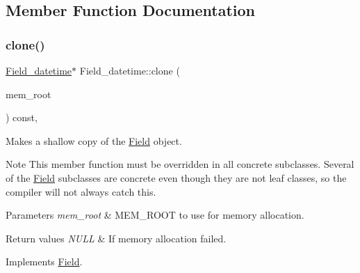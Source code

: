 \subsection{Member Function Documentation}
\mbox{\label{classField__datetime_acf05a58162e231080d9b1d4e6320abe1}} 
\subsubsection{\texorpdfstring{clone()}{clone()}\hspace{0.1cm}{\footnotesize\ttfamily [1/2]}}
{\footnotesize\ttfamily \mbox{\hyperlink{classField__datetime}{Field\+\_\+datetime}}$\ast$ Field\+\_\+datetime\+::clone (\begin{DoxyParamCaption}\item[{M\+E\+M\+\_\+\+R\+O\+OT $\ast$}]{mem\+\_\+root }\end{DoxyParamCaption}) const\hspace{0.3cm}{\ttfamily [inline]}, {\ttfamily [virtual]}}

Makes a shallow copy of the \mbox{\hyperlink{classField}{Field}} object.

\begin{DoxyNote}{Note}
This member function must be overridden in all concrete subclasses. Several of the \mbox{\hyperlink{classField}{Field}} subclasses are concrete even though they are not leaf classes, so the compiler will not always catch this.
\end{DoxyNote}

\begin{DoxyParams}{Parameters}
{\em mem\+\_\+root} & M\+E\+M\+\_\+\+R\+O\+OT to use for memory allocation. \\
\hline
\end{DoxyParams}

\begin{DoxyRetVals}{Return values}
{\em N\+U\+LL} & If memory allocation failed. \\
\hline
\end{DoxyRetVals}


Implements \mbox{\hyperlink{classField_a64979bcb9345803b031fff76a0c3d9fe}{Field}}.

\mbox{\label{classField__datetime_a5711ae971bdea1b9012ff5f683276b1d}} 

